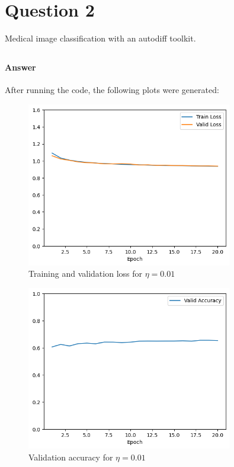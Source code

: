\documentclass{article}
\begin{document}
\section{Question 2}
Medical image classification with an autodiff toolkit.

\subsection{}

\paragraph{Answer} After running the code, the following plots were generated:

\begin{figure}[H]
    \centering
    \includegraphics[width=0.8\textwidth]{"plots/logistic_regression-training-loss-batch-16-lr-0.01-epochs-20-l2-0-opt-sgd.png"}
    \caption{Training and validation loss for $\eta = 0.01$}
    \label{2.1 0.01 Loss Plot}
\end{figure}

\begin{figure}[H]
    \centering
    \includegraphics[width=0.8\textwidth]{"plots/logistic_regression-validation-accuracy-batch-16-lr-0.01-epochs-20-l2-0-opt-sgd.png"}
    \caption{Validation accuracy for $\eta = 0.01$}
    \label{2.1 0.01 Acc Plot}
\end{figure}
\end{document}
